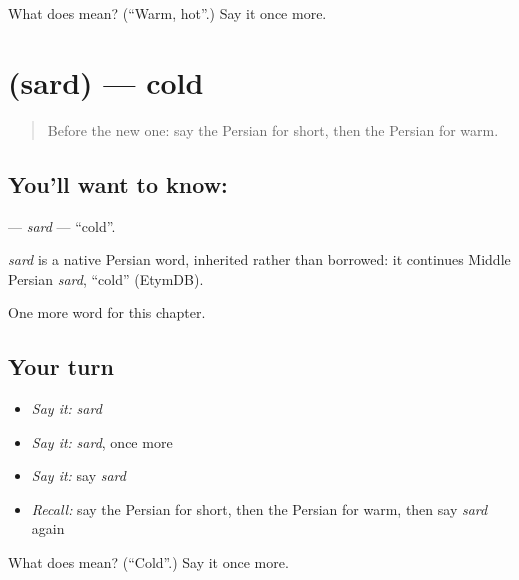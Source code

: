 \begin{tcolorbox}[breakable,colback=teal!4,colframe=teal!35!black,title={Before you move on}]
What does  mean? (\textquotedblleft{}Warm, hot\textquotedblright{}.) Say it once more.
\end{tcolorbox}
\section[\texorpdfstring{\fa{سرد} (sard)}{سرد (sard)}]{ (sard) — cold}

\label{lesson:FA-C59-sard}



\begin{quote}
Before the new one: say the Persian for short, then the Persian for warm.
\end{quote}

\subsection*{You'll want to know: }
\textbf{} — \emph{sard} — \textquotedblleft{}cold\textquotedblright{}.

\begin{cousinweb}
\emph{sard} is a native Persian word, inherited rather than borrowed: it continues Middle Persian \emph{sard}, \textquotedblleft{}cold\textquotedblright{} (EtymDB).
\end{cousinweb}

\begin{grammarlens}[title={What you've built}]
One more word for this chapter.
\end{grammarlens}

\subsection*{Your turn}
\begin{itemize}
\raggedright
  \item \emph{Say it:} \emph{sard}
  \item \emph{Say it:} \emph{sard}, once more
  \item \emph{Say it:} say \emph{sard}
  \item \emph{Recall:} say the Persian for short, then the Persian for warm, then say \emph{sard} again
\end{itemize}

\begin{tcolorbox}[breakable,colback=teal!4,colframe=teal!35!black,title={Before you move on}]
What does  mean? (\textquotedblleft{}Cold\textquotedblright{}.) Say it once more.
\end{tcolorbox}

